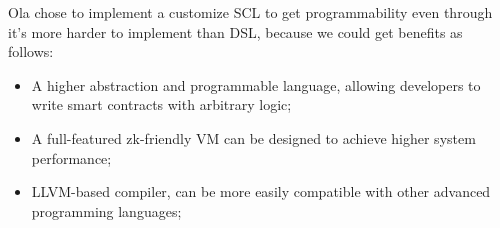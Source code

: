 Ola chose to implement a customize SCL to get programmability even through it's more harder to implement than DSL, because we could get benefits as follows:
 \begin{itemize}
 \item A higher abstraction and programmable language, allowing developers to write smart contracts with arbitrary logic;
 \item A full-featured zk-friendly VM can be designed to achieve higher system performance;
 \item LLVM-based compiler, can be more easily compatible with other advanced programming languages;
\end{itemize}